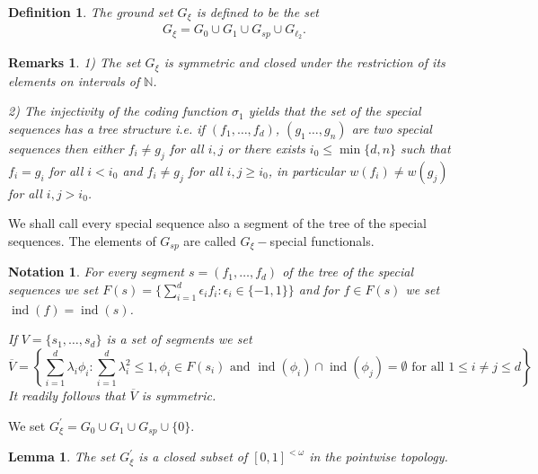 \documentclass[a4paper]{amsart}
\theoremstyle{plain}
\newtheorem{lemma}[theorem]{Lemma}
\newtheorem{definition}[theorem]{Definition}
\newtheorem{remarks}[theorem]{Remarks}
\newtheorem{notation}[theorem]{Notation}
\newcommand{\N}{\mathbb{N}}
\newcommand{\e}{\epsilon}
\DeclareMathOperator{\inde}{ind}
\begin{document}
\begin{definition}\label{dee2}
 The ground set $G_{\xi}$ is defined to be  the set
\begin{align*}
G_{\xi}=G_0\cup G_{1}\cup G_{sp}\cup G_{\ell_2}.
\end{align*}
\end{definition}
\begin{remarks}\label{r3}
1) The set  $G_{\xi}$ is symmetric and closed  under the restriction of its
elements  on intervals of $\N$.


2) The injectivity  of the coding function $\sigma_{1}$ yields that the set of the
special sequences has a tree structure i.e. if  $(f_{1},\dots,f_{d})$,
$(g_{1}\,\dots,g_{n})$ are two special sequences then either $f_{i}\ne g_{j}$ for all
$i,j$ or there exists $i_0\leq\min\{d,n\}$ such that $f_{i}=g_{i}$ for all $i<i_{0}$ and
$f_{i}\ne g_{j}$ for all $i,j\geq i_0$, in particular $w(f_i)\neq w(g_j)$ for all
$i,j>i_0$.
\end{remarks}
We shall call every special sequence also a segment of the tree of the special sequences.
The elements of $G_{sp}$ are called $G_{\xi}-$special functionals.
\begin{notation}\label{not2} For every segment $s=(f_1,\dots,f_{d})$ of the tree of the special sequences  we set
$
F(s)=\{\sum_{i=1}^{d}\e_{i}f_{i}: \e_{i}\in\{-1,1\}\}
$
and for $f\in F(s)$ we set $\inde(f)=\inde(s)$.

If $V=\{s_{1},\dots,s_{d}\}$ is a set of segments we set
$$
\overline{V}=\left\{\sum_{i=1}^{d}\lambda_{i}\phi_{i}: \sum_{i=1}^{d}\lambda_i^2\leq 1,\phi_{i}\in F(s_i)\,\,\text{and $\inde(\phi_{i})\cap\inde(\phi_{j})=\emptyset$ for all $1\leq i\ne j\leq d$}\right\}
$$
It readily follows that $\overline{V}$ is symmetric.
\end{notation}
We set  $G_{\xi}^{\prime}=G_{0}\cup G_{1}\cup G_{sp}\cup \{ 0\}$.
\begin{lemma}\label{l4}
The set $G^{\prime}_{\xi}$ is a closed  subset of $[0,1]^{<\omega}$ in the pointwise
topology.
\end{lemma}
\end{document}
